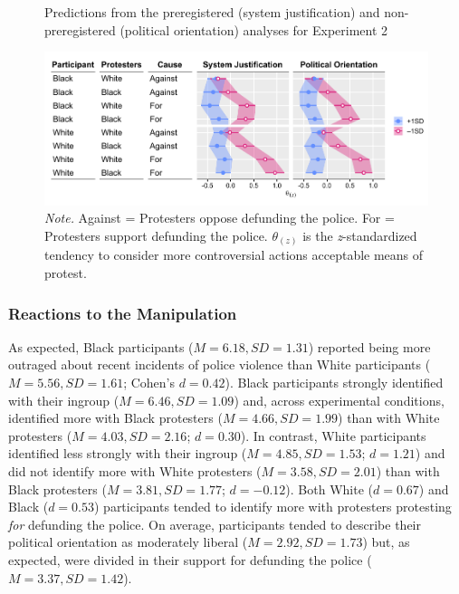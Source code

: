 \documentclass[twocolumn, 11pt, letterpaper]{article}
\begin{document}
\begin{figure}[!t]
\centering
\caption{Predictions from the preregistered (system justification) and non-preregistered (political orientation) analyses for Experiment 2}
\includegraphics[scale=1]{../Experiment 2/figures/figure-5}
\caption*{\textit{Note.} Against = Protesters oppose defunding the police. For = Protesters support defunding the police. $\theta_{(z)}$ is the \textit{z}-standardized tendency to consider more controversial actions acceptable means of protest.}
\label{fig:f5}
\end{figure}

\hypertarget{reactions-to-the-manipulation-1}{%
\subsubsection{Reactions to the
Manipulation}\label{reactions-to-the-manipulation-1}}

As expected, Black participants (\(M = 6.18, \textit{SD} = 1.31\))
reported being more outraged about recent incidents of police violence
than White participants (\(M = 5.56, \textit{SD} = 1.61\); Cohen's
\(d = 0.42\)). Black participants strongly identified with their ingroup
(\(M = 6.46, \textit{SD} = 1.09\)) and, across experimental conditions,
identified more with Black protesters (\(M = 4.66, \textit{SD} = 1.99\))
than with White protesters (\(M = 4.03, \textit{SD} = 2.16\);
\(d = 0.30\)). In contrast, White participants identified less strongly
with their ingroup (\(M = 4.85, \textit{SD} = 1.53\); \(d = 1.21\)) and
did not identify more with White protesters
(\(M = 3.58, \textit{SD} = 2.01\)) than with Black protesters
(\(M = 3.81, \textit{SD} = 1.77\); \(d = -0.12\)). Both White
(\(d = 0.67\)) and Black (\(d = 0.53\)) participants tended to identify
more with protesters protesting \emph{for} defunding the police. On
average, participants tended to describe their political orientation as
moderately liberal (\(M = 2.92, \textit{SD} = 1.73\)) but, as expected,
were divided in their support for defunding the police
(\(M = 3.37, \textit{SD} = 1.42\)).
\end{document}

